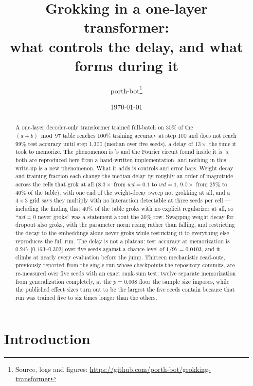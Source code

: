 \documentclass[11pt]{article}
\title{Grokking in a one-layer transformer:\\
       what controls the delay, and what forms during it}
\author{porth-bot\thanks{Source, logs and figures:
        \url{https://github.com/porth-bot/grokking-transformer}}}
\date{\today}
\begin{document}
\maketitle

\begin{abstract}
A one-layer decoder-only transformer trained full-batch on 30\% of the
$(a+b) \bmod 97$ table reaches 100\% training accuracy at step 100 and does not
reach 99\% test accuracy until step 1{,}300 (median over five seeds), a delay of
$13\times$ the time it took to memorize.
The phenomenon is \citet{power2022grokking}'s and the Fourier circuit found
inside it is \citet{nanda2023progress}'s; both are reproduced here from a
hand-written implementation, and nothing in this write-up is a new phenomenon.
What it adds is controls and error bars. Weight decay and training fraction
each change the median delay by roughly an order of magnitude across the cells
that grok at all ($8.3\times$ from $wd = 0.1$ to $wd = 1$, $9.0\times$ from
25\% to 40\% of the table), with one end of the weight-decay sweep not
grokking at all, and a
$4 \times 3$ grid says they multiply with no interaction detectable at three
seeds per cell --- including the finding that 40\% of the table groks with no
explicit regularizer at all, so ``$wd = 0$ never groks'' was a statement about
the 30\% row. Swapping weight decay for dropout also groks, with the parameter
norm rising rather than falling, and restricting the decay to the embeddings
alone never groks while restricting it to everything else reproduces the full
run. The delay is not a plateau: test accuracy at memorization is
$0.247$ [$0.163$--$0.302$] over five seeds against a chance level of
$1/97 = 0.0103$, and it climbs at nearly every evaluation before the jump.
Thirteen mechanistic read-outs, previously reported from the single run whose
checkpoints the repository commits, are re-measured over five seeds with an
exact rank-sum test: twelve separate memorization from generalization
completely, at the $p = 0.008$ floor the sample size imposes, while the
published effect sizes turn out to be the largest the five seeds contain
because that run was trained five to six times longer than the others.
\end{abstract}

\section{Introduction}
\label{sec:intro}
\end{document}
